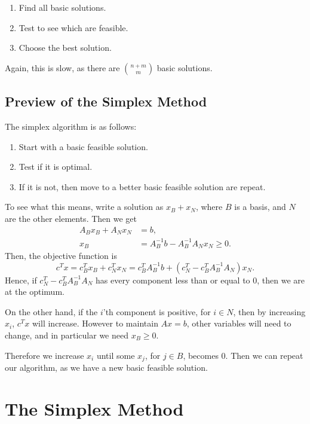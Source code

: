 \documentclass[12pt]{article}
\theoremstyle{definition}
\theoremstyle{remark}
\begin{document}
\begin{enumerate}[1)]
	\item Find all basic solutions.
	\item Test to see which are feasible.
	\item Choose the best solution.
\end{enumerate}

Again, this is slow, as there are $\binom{n+m}{m}$ basic solutions.

\subsection{Preview of the Simplex Method}%
\label{sub:preview_of_the_simplex_method}

The simplex algorithm is as follows:

\begin{enumerate}[1)]
	\item Start with a basic feasible solution.
	\item Test if it is optimal.
	\item If it is not, then move to a better basic feasible solution are repeat.
\end{enumerate}

To see what this means, write a solution as $x_B + x_N$, where $B$ is a basis, and $N$ are the other elements. Then we get
\begin{align*}
	A_{B}x_B + A_Nx_N &= b, \\
	x_B &= A_B^{-1}b - A_B^{-1}A_Nx_N \geq 0.
\end{align*}
Then, the objective function is
\[
	c^{T}x = c^{T}_Bx_B + c_N^{T}x_N = c^{T}_BA_B^{-1}b + (c_N^{T} - c_B^{T}A_B^{-1}A_N)x_N
.\]
Hence, if $c_N^{T} - c_B^{T}A_B^{-1}A_N$ has every component less than or equal to $0$, then we are at the optimum.

On the other hand, if the $i$'th component is positive, for $i \in N$, then by increasing $x_i$, $c^{T}x$ will increase. However to maintain $Ax = b$, other variables will need to change, and in particular we need $x_B \geq 0$.

Therefore we increase $x_i$ until some $x_j$, for $j \in B$, becomes $0$. Then we can repeat our algorithm, as we have a new basic feasible solution.

\newpage

\section{The Simplex Method}%
\label{sec:the_simplex_method}
\end{document}
